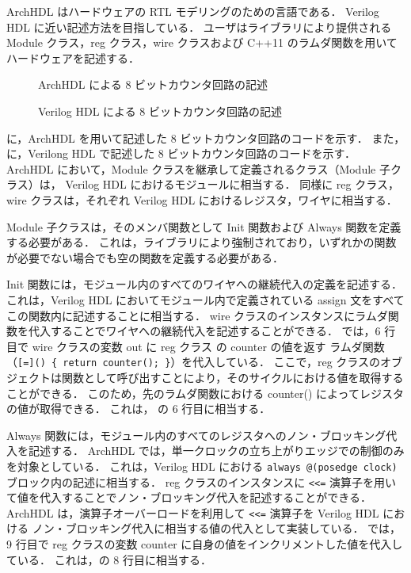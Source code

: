 ArchHDL はハードウェアの RTL モデリングのための言語である．
Verilog HDL に近い記述方法を目指している．
ユーザはライブラリにより提供される Module クラス，reg クラス，wire クラスおよび C++11 のラムダ関数を用いて
ハードウェアを記述する．

\begin{figure}[t]
 
 \caption{ArchHDL による 8 ビットカウンタ回路の記述}
 \label{src:counter}
\end{figure}

\begin{figure}[t]
 
 \caption{Verilog HDL による 8 ビットカウンタ回路の記述}
 \label{src:counter_v}
\end{figure}

に，ArchHDL を用いて記述した 8 ビットカウンタ回路のコードを示す．
また， に，Verilong HDL で記述した 8 ビットカウンタ回路のコードを示す．
ArchHDL において，Module クラスを継承して定義されるクラス（Module 子クラス）は，
Verilog HDL におけるモジュールに相当する．
同様に reg クラス，wire クラスは，それぞれ Verilog HDL におけるレジスタ，ワイヤに相当する．

Module 子クラスは，そのメンバ関数として Init 関数および Always 関数を定義する必要がある．
これは，ライブラリにより強制されており，いずれかの関数が必要でない場合でも空の関数を定義する必要がある．

Init 関数には，モジュール内のすべてのワイヤへの継続代入の定義を記述する．
これは，Verilog HDL においてモジュール内で定義されている assign 文をすべてこの関数内に記述することに相当する．
wire クラスのインスタンスにラムダ関数を代入することでワイヤへの継続代入を記述することができる．
では，6 行目で wire クラスの変数 out に reg クラス の counter の値を返す
ラムダ関数（\verb/[=]() { return counter(); }/）を代入している．
ここで，reg クラスのオブジェクトは関数として呼び出すことにより，そのサイクルにおける値を取得することができる．
このため，先のラムダ関数における counter() によってレジスタの値が取得できる．
これは， の 6 行目に相当する．

Always 関数には，モジュール内のすべてのレジスタへのノン・ブロッキング代入を記述する．
ArchHDL では，単一クロックの立ち上がりエッジでの制御のみを対象としている．
これは，Verilog HDL における \verb/always @(posedge clock)/ ブロック内の記述に相当する．
reg クラスのインスタンスに \verb/<<=/ 演算子を用いて値を代入することでノン・ブロッキング代入を記述することができる．
ArchHDL は，演算子オーバーロードを利用して \verb/<<=/ 演算子を Verilog HDL における
ノン・ブロッキング代入に相当する値の代入として実装している．
では，9 行目で reg クラスの変数 counter に自身の値をインクリメントした値を代入している．
これは，の 8 行目に相当する．


